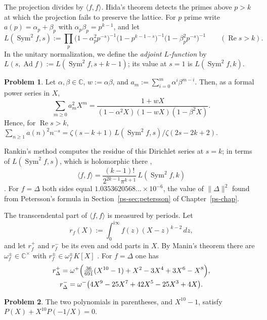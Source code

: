 \documentclass[reqno]{amsart}
\newcounter{chap}
\theoremstyle{definition}
\newtheorem{problem}{Problem}[section]
\theoremstyle{plain}
\newcommand{\C}{\mathbb{C}}
\newcommand{\Sym}{\operatorname{Sym}}
\newcommand{\Ad}{\operatorname{Ad}}
\newcommand{\ii}{\mathrm{i}}
\begin{document}
The projection divides by \(\langle f,f\rangle\).  Hida's theorem detects the primes above \(p>k\) at which the projection fails to preserve the lattice.  For \(p\) prime write \(a(p) = \alpha_p + \beta_p\) with \(\alpha_p\beta_p = p^{k-1}\), and let
\[
  L(\Sym^2 f, s) := \prod_p \bigl(1 - \alpha_p^2 p^{-s}\bigr)^{-1} \bigl(1 - p^{k-1-s}\bigr)^{-1} \bigl(1 - \beta_p^2 p^{-s}\bigr)^{-1} \qquad (\operatorname{Re} s > k) .
\]
In the unitary normalization, we define the \emph{adjoint \(L\)-function} by \(L(s, \Ad f) := L(\Sym^2 f, s + k - 1)\); its value at \(s = 1\) is \(L(\Sym^2 f, k)\).

\begin{problem}\label{pr:euler}
Let \(\alpha,\beta\in\C\), \(w:=\alpha\beta\), and \(a_m:=\sum_{i=0}^m\alpha^i\beta^{m-i}\).  Then, as a formal power series in \(X\),
\[
  \sum_{m \ge 0} a_m^2 X^m = \frac{1 + wX}{(1 - \alpha^2 X)(1 - wX)(1 - \beta^2 X)} .
\]
Hence, for \(\operatorname{Re}s>k\), \(\sum_{n \ge 1} a(n)^2 n^{-s} = \zeta(s-k+1)\, L(\Sym^2 f, s) / \zeta(2s-2k+2)\).
\end{problem}

Rankin's method \cite{Ra} computes the residue of this Dirichlet series at \(s = k\); in terms of \(L(\Sym^2 f, s)\), which is holomorphic there \cite{Sh},
\begin{equation}\label{eq:rankin}
  \langle f, f \rangle = \frac{(k-1)!}{2^{2k-1} \pi^{k+1}} \, L(\Sym^2 f, k)
\end{equation}
\cite[p.~109, (3)--(5)]{Za}.  For \(f = \Delta\) both sides equal \(1.0353620568\ldots \times 10^{-6}\), the value of \(\lVert\Delta\rVert^2\) found from Petersson's formula in Section~\ref{ps-sec:petersson} of Chapter~\ref{ps-chap}.

The transcendental part of \(\langle f, f \rangle\) is measured by periods.  Let
\[
  r_f(X) := \int_0^{\ii\infty} f(z) (X - z)^{k-2} \, dz ,
\]
and let \(r_f^+\) and \(r_f^-\) be its even and odd parts in \(X\).  By Manin's theorem there are \(\omega_f^\pm \in \C^\times\) with \(r_f^\pm \in \omega_f^\pm K[X]\) \cite{Mn}.  For \(f = \Delta\) one has \cite{KZ}
\begin{gather*}
  r_\Delta^+ = \omega^+ \Bigl( \tfrac{36}{691}(X^{10} - 1) + X^2 - 3X^4 + 3X^6 - X^8 \Bigr), \\
  r_\Delta^- = \omega^- \bigl( 4X^9 - 25X^7 + 42X^5 - 25X^3 + 4X \bigr) .
\end{gather*}

\begin{problem}\label{pr:relation}
The two polynomials in parentheses, and \(X^{10} - 1\), satisfy \(P(X) + X^{10} P(-1/X) = 0\).
\end{problem}
\end{document}
